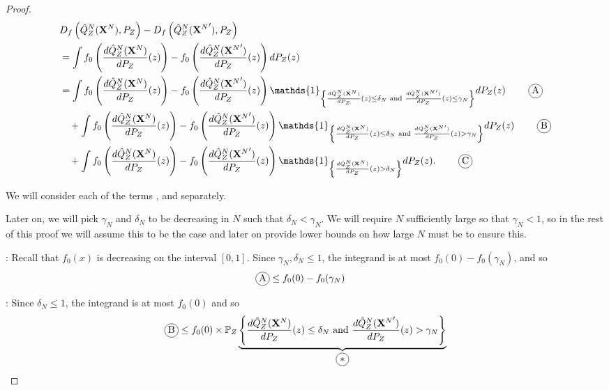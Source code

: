 \begin{proof}
\begin{align*}
    & D_f\left( \hat{Q}_Z^N(\XN) , P_Z\right) - D_f\left( \hat{Q}_Z^N({\XN}') , P_Z\right)  \\
    &= \int f_0\left( \frac{d\hat{Q}_Z^N(\XN)}{dP_Z}(z) \right) - f_0\left( \frac{d\hat{Q}_Z^N({\XN}')}{dP_Z}(z) \right) dP_Z(z)  \\
    &= \int f_0\left( \frac{d\hat{Q}_Z^N(\XN)}{dP_Z}(z) \right) - f_0\left( \frac{d\hat{Q}_Z^N({\XN}')}{dP_Z}(z) \right) \mathds{1}_{\left\lbrace \frac{d\hat{Q}_Z^N(\XN)}{dP_Z}(z) \leq \delta_N \text{ and } \frac{d\hat{Q}_Z^N({\XN}')}{dP_Z}(z) \leq \gamma_N \right\rbrace} dP_Z(z) \tag*{\encircle{A}}\\
    & \quad + \int f_0\left( \frac{d\hat{Q}_Z^N(\XN)}{dP_Z}(z) \right) - f_0\left( \frac{d\hat{Q}_Z^N({\XN}')}{dP_Z}(z) \right) \mathds{1}_{\left\lbrace \frac{d\hat{Q}_Z^N(\XN)}{dP_Z}(z) \leq \delta_N \text{ and } \frac{d\hat{Q}_Z^N({\XN}')}{dP_Z}(z) > \gamma_N \right\rbrace} dP_Z(z) \tag*{\encircle{B}}\\
    & \quad + \int f_0\left( \frac{d\hat{Q}_Z^N(\XN)}{dP_Z}(z) \right) - f_0\left( \frac{d\hat{Q}_Z^N({\XN}')}{dP_Z}(z) \right) \mathds{1}_{\left\lbrace \frac{d\hat{Q}_Z^N(\XN)}{dP_Z}(z) > \delta_N \right\rbrace} dP_Z(z). \tag*{\encircle{C}}
\end{align*}

We will consider each of the terms ,  and   separately.

Later on, we will pick $\gamma_N$ and $\delta_N$ to be decreasing in $N$ such that $\delta_N < \gamma_N$.
We will require $N$ sufficiently large so that $\gamma_N< 1$, so in the rest of this proof we will assume this to be the case and later on provide lower bounds on how large $N$ must be to ensure this.

: 
Recall that $f_0(x)$ is decreasing on the interval $[0,1]$.
Since $\gamma_N, \delta_N \leq 1$, 
the integrand is at most $f_0(0) - f_0(\gamma_N)$, and so 
\begin{align*}
    \encircle{A} &\leq f_0(0) - f_0(\gamma_N)
\end{align*}


:
Since $\delta_N \leq 1$,
the integrand is at most $f_0(0)$ and so
\begin{align*}
    \encircle{B} &\leq f_0(0) \times \mathbb{P}_Z
    \underbrace{
    \left\lbrace \frac{d\hat{Q}_Z^N(\XN)}{dP_Z}(z) \leq \delta_N \text{ and } \frac{d\hat{Q}_Z^N({\XN}')}{dP_Z}(z) > \gamma_N \right\rbrace}_{\encircle{$*$}} \\
\end{align*}


\end{proof}
